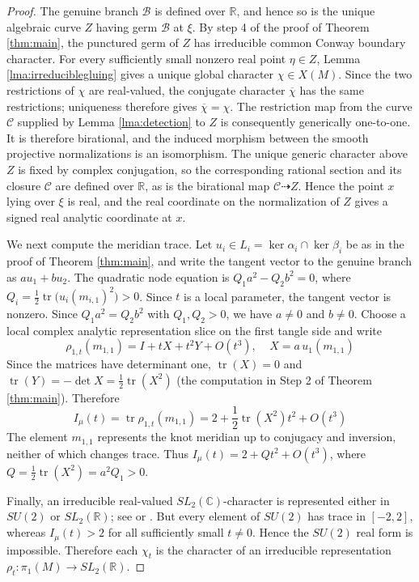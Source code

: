 \documentclass{article}
\theoremstyle{plain}
\theoremstyle{definition}
\theoremstyle{plain}
\theoremstyle{plain}
\theoremstyle{plain}
\theoremstyle{remark}
\theoremstyle{remark}
\theoremstyle{plain}
\theoremstyle{plain}
\newcounter{main}
\theoremstyle{plain}
\theoremstyle{plain}
\begin{document}
\begin{proof}
The genuine branch $\mathcal B$ is defined over $\mathbb R$, and hence so is the unique algebraic curve $Z$ having germ $\mathcal B$ at $\xi$. By step 4 of the proof of Theorem \ref{thm:main}, the punctured germ of $Z$ has irreducible common Conway boundary character. For every sufficiently small nonzero real point $\eta \in Z$, Lemma \ref{lma:irreduciblegluing} gives a unique global character $\chi \in X(M)$. Since the two restrictions of $\chi$ are real-valued, the conjugate character $\overline\chi$ has the same restrictions; uniqueness therefore gives $\overline\chi = \chi$. The restriction map from the curve $\mathcal C$ supplied by Lemma \ref{lma:detection} to $Z$ is consequently generically one-to-one. It is therefore birational, and the induced morphism between the smooth projective normalizations is an isomorphism. The unique generic character above $Z$ is fixed by complex conjugation, so the corresponding rational section and its closure $\mathcal C$ are defined over $\mathbb R$, as is the birational map $\mathcal C \dashrightarrow Z$. Hence the point $x$ lying over $\xi$ is real, and the real coordinate on the normalization of $Z$ gives a signed real analytic coordinate at $x$. 

\medskip
	
We next compute the meridian trace. Let $u_i\in L_i=\ker\alpha_i\cap\ker\beta_i$ be as in the proof of
Theorem \ref{thm:main}, and write the tangent vector to the genuine branch as $a u_1+b u_2$. The quadratic node equation is $Q_1a^2-Q_2b^2=0$, where $Q_i = \frac12\operatorname{tr}\bigl(u_i(m_{i,1})^2\bigr)>0$. Since $t$ is a local parameter, the tangent vector is nonzero. Since $Q_1a^2 = Q_2b^2$ with $Q_1, Q_2 > 0$, we have $a \neq 0$ and $b \neq 0$. Choose a local complex analytic representation slice on the first tangle side and write
\begin{equation*}
	\rho_{1,t}(m_{1,1}) = I+tX+t^2Y+O(t^3), \ \ \ \ \ X=a\,u_1(m_{1,1})
\end{equation*}
Since the matrices have determinant one, $\operatorname{tr}(X)=0$ and $\operatorname{tr}(Y) = -\det X = \frac12\operatorname{tr}(X^2)$ (the computation in Step 2 of Theorem \ref{thm:main}). Therefore
\begin{equation*}
	I_\mu(t) = \operatorname{tr}\rho_{1,t}(m_{1,1}) = 2+ \frac12\operatorname{tr}(X^2)t^2 + O(t^3)
\end{equation*}
The element $m_{1,1}$ represents the knot meridian up to conjugacy and inversion, neither of which changes trace. Thus $I_\mu(t) = 2+Qt^2+O(t^3)$, where $Q = \frac12\operatorname{tr}(X^2) = a^2Q_1 >0$. 

\medskip
	
Finally, an irreducible real-valued $SL_2(\mathbb C)$-character is represented either in $SU(2)$ or $SL_2(\mathbb R)$; see \cite{goldman} or \cite{dunfieldrasmussen}. But every element of $SU(2)$ has trace in $[-2,2]$, whereas $I_\mu(t)>2$ for all sufficiently small $t\neq0$. Hence the $SU(2)$ real form is impossible. Therefore each $\chi_t$ is the character of an irreducible representation $\rho_t:\pi_1(M)\longrightarrow SL_2(\mathbb R)$.
\end{proof}
\end{document}
